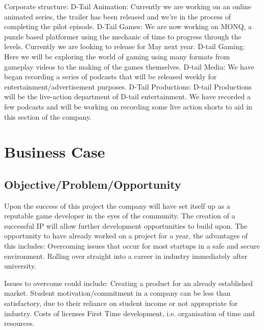 \documentclass{scrartcl}
\begin{document}
Corporate structure:
\newline
\newline
D-Tail Animation:
Currently we are working on an online animated series, the trailer has been released and we’re in the process of completing the pilot episode.
\newline
\newline
D-Tail Games:
We are now working on MONQ, a puzzle based platformer using the mechanic of time to progress through the levels. Currently we are looking to release for May next year.
\newline
\newline
D-tail Gaming: 
Here we will be exploring the world of gaming using many formats from gameplay videos to the making of the games themselves.
\newline
\newline
D-tail Media:
We have began recording a series of podcasts that will be released weekly for entertainment/advertisement purposes.
\newline
\newline
D-Tail Productions:
D-tail Productions will be the live-action department of D-tail entertainment. 
We have recorded a few podcasts and will be working on recording some live action shorts to aid in this section of the company.


\section{Business Case}
\subsection{Objective/Problem/Opportunity}
Upon the success of this project the company will have set itself up as a reputable game developer in the eyes of the community.
The creation of a successful IP will allow further development opportunities to build upon.
The opportunity to have already worked on a project for a year, the advantages of this includes:
Overcoming issues that occur for most startups in a safe and secure environment. 
Rolling over straight into a career in industry immediately after university.

Issues to overcome could include:
Creating a product for an already established market.
Student motivation/commitment in a company can be less than satisfactory, due to their reliance on student income or not appropriate for industry.
Costs of licenses
First Time development, i.e. organisation of time and resources.
\end{document}
